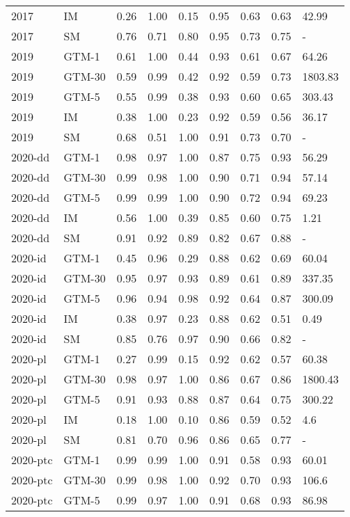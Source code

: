 \begin{tabular}{llrrrrrrl}
2017 & IM & 0.26 & 1.00 & 0.15 & 0.95 & 0.63 & 0.63 & 42.99 \\
2017 & SM & 0.76 & 0.71 & 0.80 & 0.95 & 0.73 & 0.75 & - \\
2019 & GTM-1 & 0.61 & 1.00 & 0.44 & 0.93 & 0.61 & 0.67 & 64.26 \\
2019 & GTM-30 & 0.59 & 0.99 & 0.42 & 0.92 & 0.59 & 0.73 & 1803.83 \\
2019 & GTM-5 & 0.55 & 0.99 & 0.38 & 0.93 & 0.60 & 0.65 & 303.43 \\
2019 & IM & 0.38 & 1.00 & 0.23 & 0.92 & 0.59 & 0.56 & 36.17 \\
2019 & SM & 0.68 & 0.51 & 1.00 & 0.91 & 0.73 & 0.70 & - \\
2020-dd & GTM-1 & 0.98 & 0.97 & 1.00 & 0.87 & 0.75 & 0.93 & 56.29 \\
2020-dd & GTM-30 & 0.99 & 0.98 & 1.00 & 0.90 & 0.71 & 0.94 & 57.14 \\
2020-dd & GTM-5 & 0.99 & 0.99 & 1.00 & 0.90 & 0.72 & 0.94 & 69.23 \\
2020-dd & IM & 0.56 & 1.00 & 0.39 & 0.85 & 0.60 & 0.75 & 1.21 \\
2020-dd & SM & 0.91 & 0.92 & 0.89 & 0.82 & 0.67 & 0.88 & - \\
2020-id & GTM-1 & 0.45 & 0.96 & 0.29 & 0.88 & 0.62 & 0.69 & 60.04 \\
2020-id & GTM-30 & 0.95 & 0.97 & 0.93 & 0.89 & 0.61 & 0.89 & 337.35 \\
2020-id & GTM-5 & 0.96 & 0.94 & 0.98 & 0.92 & 0.64 & 0.87 & 300.09 \\
2020-id & IM & 0.38 & 0.97 & 0.23 & 0.88 & 0.62 & 0.51 & 0.49 \\
2020-id & SM & 0.85 & 0.76 & 0.97 & 0.90 & 0.66 & 0.82 & - \\
2020-pl & GTM-1 & 0.27 & 0.99 & 0.15 & 0.92 & 0.62 & 0.57 & 60.38 \\
2020-pl & GTM-30 & 0.98 & 0.97 & 1.00 & 0.86 & 0.67 & 0.86 & 1800.43 \\
2020-pl & GTM-5 & 0.91 & 0.93 & 0.88 & 0.87 & 0.64 & 0.75 & 300.22 \\
2020-pl & IM & 0.18 & 1.00 & 0.10 & 0.86 & 0.59 & 0.52 & 4.6 \\
2020-pl & SM & 0.81 & 0.70 & 0.96 & 0.86 & 0.65 & 0.77 & - \\
2020-ptc & GTM-1 & 0.99 & 0.99 & 1.00 & 0.91 & 0.58 & 0.93 & 60.01 \\
2020-ptc & GTM-30 & 0.99 & 0.98 & 1.00 & 0.92 & 0.70 & 0.93 & 106.6 \\
2020-ptc & GTM-5 & 0.99 & 0.97 & 1.00 & 0.91 & 0.68 & 0.93 & 86.98 \\

\end{tabular}
